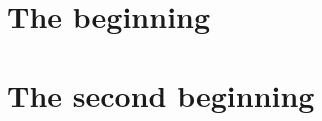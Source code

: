 \documentclass[12pt, twoside]{report}
\begin{document}
\chapter{The beginning}
\lipsum[2-40] 

\chapter{The second beginning}
\lipsum[2-40] 
\end{document}
